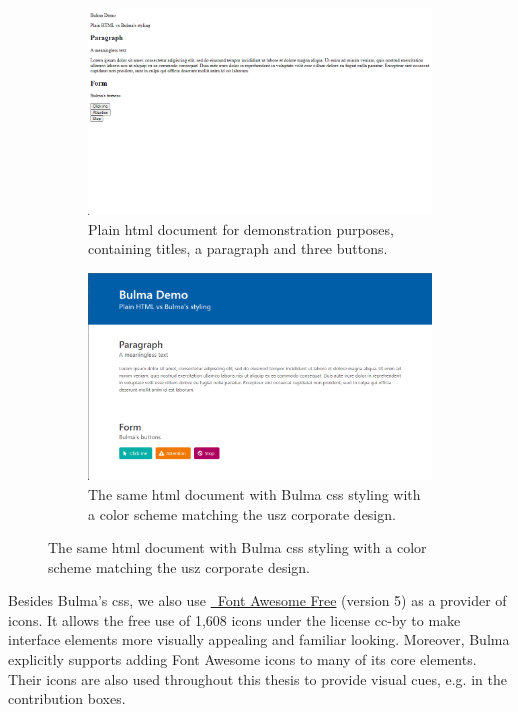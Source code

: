 \documentclass[\relativeRoot/main.tex]{subfiles}
\begin{document}
\begin{figure}
    \begin{subfigure}[b]{0.48\textwidth}
        \includegraphics[width=\textwidth, frame]{figures/demo_without_bulma.png}
        \caption[
            Plain demo HTML document
        ]{
            Plain \acrshort{html} document for demonstration purposes, containing titles, a paragraph and three buttons.
        }
        \label{fig:lyprox:plain}
    \end{subfigure}
    \hfill
    \begin{subfigure}[b]{0.48\textwidth}
        \includegraphics[width=\textwidth, frame]{figures/demo_with_bulma.png}
        \caption[
            HTML demo document with Bulma styling
        ]{
            The same \acrshort{html} document with Bulma \acrshort{css} styling with a color scheme matching the \gls{usz} corporate design.
        }
        \label{fig:lyprox:bulma}
    \end{subfigure}
    \label{fig:lyprox:plain_vs_bulma}
\end{figure}

Besides Bulma's \gls{css}, we also use \href{https://fontawesome.com}{~Font Awesome Free} (version 5) \cite{noauthor_font_2022} as a provider of icons. It allows the free use of 1,608 icons under the license  \gls{cc-by} to make interface elements more visually appealing and familiar looking. Moreover, Bulma explicitly supports adding Font Awesome icons to many of its core elements. Their icons are also used throughout this thesis to provide visual cues, e.g. in the contribution boxes.
\end{document}
